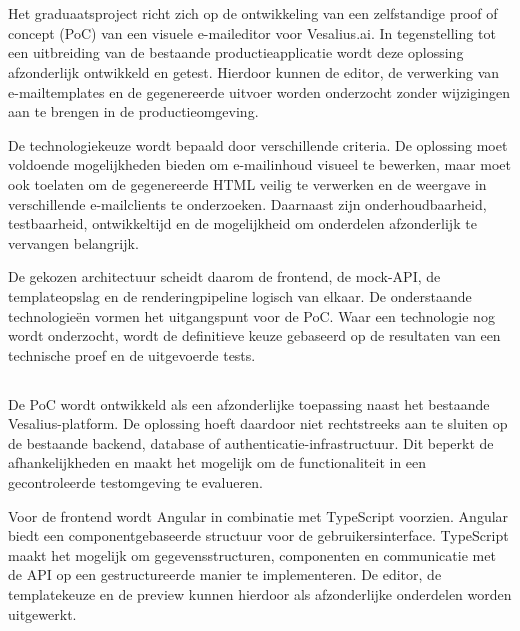 \chapter{}%
\label{ch:technologie}
Het graduaatsproject richt zich op de ontwikkeling van een zelfstandige
proof of concept (PoC) van een visuele e-maileditor voor Vesalius.ai.
In tegenstelling tot een uitbreiding van de bestaande productieapplicatie
wordt deze oplossing afzonderlijk ontwikkeld en getest. Hierdoor kunnen de
editor, de verwerking van e-mailtemplates en de gegenereerde uitvoer worden
onderzocht zonder wijzigingen aan te brengen in de productieomgeving.

De technologiekeuze wordt bepaald door verschillende criteria. De oplossing
moet voldoende mogelijkheden bieden om e-mailinhoud visueel te bewerken,
maar moet ook toelaten om de gegenereerde HTML veilig te verwerken en de
weergave in verschillende e-mailclients te onderzoeken. Daarnaast zijn
onderhoudbaarheid, testbaarheid, ontwikkeltijd en de mogelijkheid om
onderdelen afzonderlijk te vervangen belangrijk.

De gekozen architectuur scheidt daarom de frontend, de mock-API, de
templateopslag en de renderingpipeline logisch van elkaar. De onderstaande
technologieën vormen het uitgangspunt voor de PoC. Waar een technologie
nog wordt onderzocht, wordt de definitieve keuze gebaseerd op de resultaten
van een technische proef en de uitgevoerde tests.

\section{}%
\label{sec:bestaande-omgeving}
De PoC wordt ontwikkeld als een afzonderlijke toepassing naast het bestaande
Vesalius-platform. De oplossing hoeft daardoor niet rechtstreeks aan te
sluiten op de bestaande backend, database of authenticatie-infrastructuur.
Dit beperkt de afhankelijkheden en maakt het mogelijk om de functionaliteit
in een gecontroleerde testomgeving te evalueren.

Voor de frontend wordt Angular in combinatie met TypeScript voorzien.
Angular biedt een componentgebaseerde structuur voor de gebruikersinterface.
TypeScript maakt het mogelijk om gegevensstructuren, componenten en
communicatie met de API op een gestructureerde manier te implementeren.
De editor, de templatekeuze en de preview kunnen hierdoor als afzonderlijke
onderdelen worden uitgewerkt.

